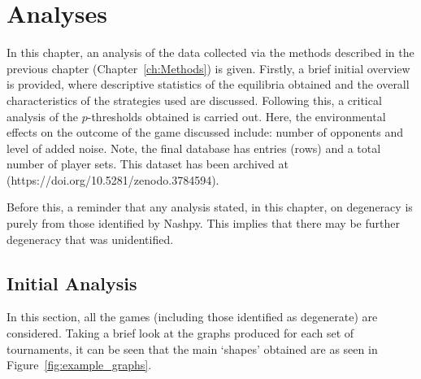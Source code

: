 \chapter{Analyses}\label{ch:Analysis}
In this chapter, an analysis of the data collected via the methods described in
the previous chapter (Chapter~\ref{ch:Methods}) is given. Firstly, a brief
initial overview is provided, where descriptive statistics of the equilibria
obtained and the overall characteristics of the strategies used are discussed.
Following this, a critical analysis of the \(p\)-thresholds obtained is carried
out. Here, the environmental effects on the outcome of the game discussed
include: number of opponents and level of added noise. Note, the final database
has
 entries (rows) and a total number of 
 player
sets. This dataset has been archived at (https://doi.org/10.5281/zenodo.3784594).

Before this, a reminder that any analysis stated, in this chapter, on degeneracy
is purely from those identified by Nashpy. This implies that there may be
further degeneracy that was unidentified.

\section{Initial Analysis}\label{sec:Initial_Analysis}
In this section, all the games (including those identified as degenerate)
are considered. Taking a brief look at the graphs produced for each set of
tournaments, it can be seen that the main `shapes' obtained are as seen in Figure~\ref{fig:example_graphs}.

